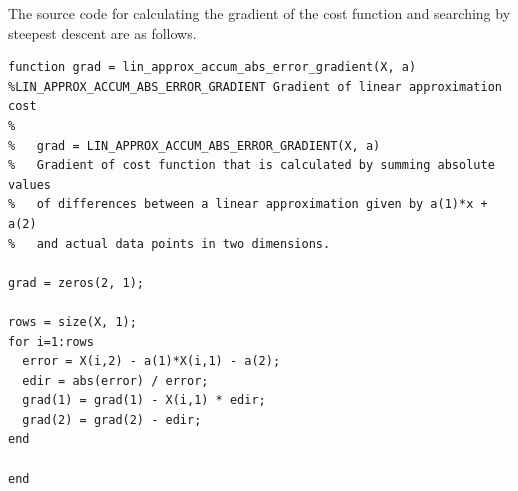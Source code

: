 \documentclass{article}
\begin{document}
The source code for calculating the gradient of the cost function and searching by steepest descent are as follows.

\vspace{0.25in}
\begin{lstlisting}
function grad = lin_approx_accum_abs_error_gradient(X, a)
%LIN_APPROX_ACCUM_ABS_ERROR_GRADIENT Gradient of linear approximation cost
%
%   grad = LIN_APPROX_ACCUM_ABS_ERROR_GRADIENT(X, a)
%   Gradient of cost function that is calculated by summing absolute values
%   of differences between a linear approximation given by a(1)*x + a(2) 
%   and actual data points in two dimensions.

grad = zeros(2, 1);

rows = size(X, 1);
for i=1:rows
  error = X(i,2) - a(1)*X(i,1) - a(2);
  edir = abs(error) / error;
  grad(1) = grad(1) - X(i,1) * edir;
  grad(2) = grad(2) - edir;
end

end

\end{lstlisting}

\vspace{0.25in}
\end{document}
